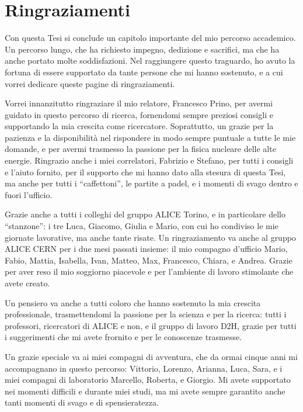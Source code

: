 \chapter*{Ringraziamenti}
Con questa Tesi si conclude un capitolo importante del mio percorso accademico. Un percorso lungo, che ha richiesto impegno, dedizione e sacrifici, ma che ha anche portato molte soddisfazioni. Nel raggiungere questo traguardo, ho avuto la fortuna di essere supportato da tante persone che mi hanno sostenuto, e a cui vorrei dedicare queste pagine di ringraziamenti.

\begin{sloppypar}
Vorrei innanzitutto ringraziare il mio relatore, Francesco Prino, per avermi guidato in questo percorso di ricerca, fornendomi sempre preziosi consigli e supportando la mia crescita come ricercatore. Soprattutto, un grazie per la pazienza e la disponibilità nel rispondere in modo sempre puntuale a tutte le mie domande, e per avermi trasmesso la passione per la fisica nucleare delle alte energie. Ringrazio anche i miei correlatori, Fabrizio e Stefano, per tutti i consigli e l'aiuto fornito, per il supporto che mi hanno dato alla stesura di questa Tesi, ma anche per tutti i ``caffettoni'', le partite a padel, e i momenti di svago dentro e fuori l'ufficio.
\end{sloppypar}

Grazie anche a tutti i colleghi del gruppo ALICE Torino, e in particolare dello ``stanzone'': i tre Luca, Giacomo, Giulia e Mario, con cui ho condiviso le mie giornate lavorative, ma anche tante risate. Un ringraziamento va anche al gruppo ALICE CERN per i due mesi passati insieme: il mio compagno d'ufficio Mario, Fabio, Mattia, Isabella, Ivan, Matteo, Max, Francesco, Chiara, e Andrea. Grazie per aver reso il mio soggiorno piacevole e per l'ambiente di lavoro stimolante che avete creato.

Un pensiero va anche a tutti coloro che hanno sostenuto la mia crescita professionale, trasmettendomi la passione per la scienza e per la ricerca: tutti i professori, ricercatori di ALICE e non, e il gruppo di lavoro D2H, grazie per tutti i suggerimenti che mi avete frornito e per le conoscenze trasmesse.

Un grazie speciale va ai miei compagni di avventura, che da ormai cinque anni mi accompagnano in questo percorso: Vittorio, Lorenzo, Arianna, Luca, Sara, e i miei compagni di laboratorio Marcello, Roberta, e Giorgio. Mi avete supportato nei momenti difficili e durante miei studi, ma mi avete sempre garantito anche tanti momenti di svago e di spensieratezza.

